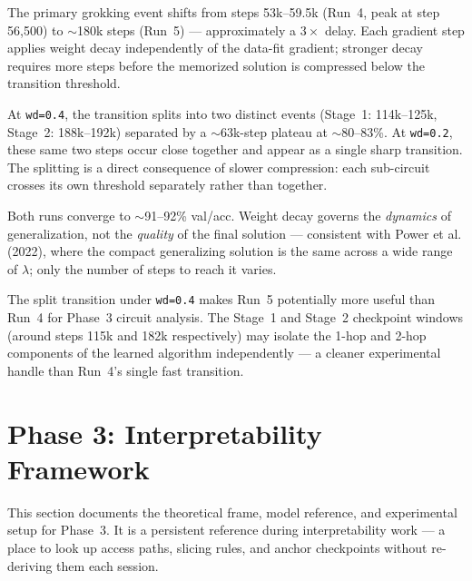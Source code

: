 \documentclass[11pt, a4paper]{article}
\begin{document}
\begin{description}[noitemsep]
  \item[Delayed transition.] The primary grokking event shifts from steps
    53k--59.5k (Run~4, peak at step 56{,}500) to $\sim$180k steps (Run~5) ---
    approximately a $3\times$ delay. Each
    gradient step applies weight decay independently of the data-fit gradient;
    stronger decay requires more steps before the memorized solution is
    compressed below the transition threshold.

  \item[Split transition (multi-stage grokking).] At \texttt{wd=0.4}, the
    transition splits into two distinct events (Stage~1: 114k--125k, Stage~2:
    188k--192k) separated by a $\sim$63k-step plateau at $\sim$80--83\%. At
    \texttt{wd=0.2}, these same two steps occur close together and appear as a
    single sharp transition. The splitting is a direct consequence of slower
    compression: each sub-circuit crosses its own threshold separately rather
    than together.

  \item[Identical final accuracy.] Both runs converge to $\sim$91--92\% val/acc.
    Weight decay governs the \emph{dynamics} of generalization, not the
    \emph{quality} of the final solution --- consistent with Power
    et al.\,(2022), where the compact generalizing solution is the same across
    a wide range of $\lambda$; only the number of steps to reach it varies.
\end{description}

The split transition under \texttt{wd=0.4} makes Run~5 potentially more useful
than Run~4 for Phase~3 circuit analysis. The Stage~1 and Stage~2 checkpoint
windows (around steps 115k and 182k respectively) may isolate the 1-hop and
2-hop components of the learned algorithm independently --- a cleaner
experimental handle than Run~4's single fast transition.

\section{Phase 3: Interpretability Framework}
\label{sec:interp-framework}

This section documents the theoretical frame, model reference, and experimental
setup for Phase~3. It is a persistent reference during interpretability work ---
a place to look up access paths, slicing rules, and anchor checkpoints without
re-deriving them each session.
\end{document}
